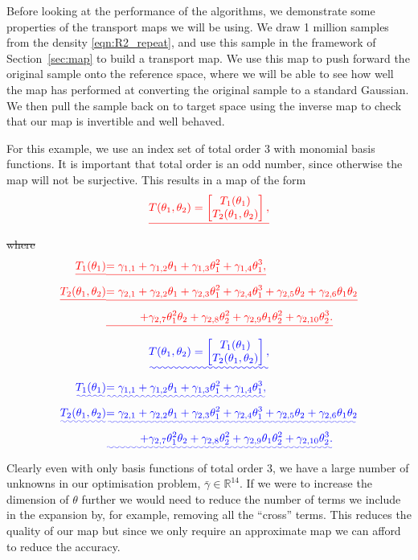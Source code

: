 \documentclass[final]{siamltex}
\providecommand{\DIFadd}[1]{{\protect\color{blue}\uwave{#1}}} %
\providecommand{\DIFdel}[1]{{\protect\color{red}\sout{#1}}}                      %
\providecommand{\DIFaddbegin}{} %
\providecommand{\DIFaddend}{} %
\providecommand{\DIFdelbegin}{} %
\providecommand{\DIFdelend}{} %
\newcommand{\DIFscaledelfig}{0.5}
\newlength{\DIFdelgraphicswidth} %
\newlength{\DIFdelgraphicsheight} %
\newcommand{\DIFaddincludegraphics}[2][]{{\color{blue}\fbox{\DIFOincludegraphics[#1]{#2}}}} %
\newcommand{\DIFdelincludegraphics}[2][]{%
\sbox{\DIFdelgraphicsbox}{\DIFOincludegraphics[#1]{#2}}%
\settoboxwidth{\DIFdelgraphicswidth}{\DIFdelgraphicsbox} %
\settoboxtotalheight{\DIFdelgraphicsheight}{\DIFdelgraphicsbox} %
\scalebox{\DIFscaledelfig}{%
\parbox[b]{\DIFdelgraphicswidth}{\usebox{\DIFdelgraphicsbox}\\[-\baselineskip] \rule{\DIFdelgraphicswidth}{0em}}\llap{\resizebox{\DIFdelgraphicswidth}{\DIFdelgraphicsheight}{%
\setlength{\unitlength}{\DIFdelgraphicswidth}%
\begin{picture}(1,1)%
\thicklines\linethickness{2pt} %
{\color[rgb]{1,0,0}\put(0,0){\framebox(1,1){}}}%
{\color[rgb]{1,0,0}\put(0,0){\line( 1,1){1}}}%
{\color[rgb]{1,0,0}\put(0,1){\line(1,-1){1}}}%
\end{picture}%
}\hspace*{3pt}}} %
} %
\DeclareRobustCommand{\DIFaddbegin}{\DIFOaddbegin \let\includegraphics\DIFaddincludegraphics} %
\DeclareRobustCommand{\DIFaddend}{\DIFOaddend \let\includegraphics\DIFOincludegraphics} %
\DeclareRobustCommand{\DIFdelbegin}{\DIFOdelbegin \let\includegraphics\DIFdelincludegraphics} %
\DeclareRobustCommand{\DIFdelend}{\DIFOaddend \let\includegraphics\DIFOincludegraphics} %
\begin{document}
Before looking at the performance of the algorithms, we demonstrate some properties of the transport maps we will be using. We draw 1 million samples from the density \eqref{eqn:R2_repeat}, and use this sample in the framework of Section~\ref{sec:map} to build a transport map. We use this map to push forward the original sample onto the reference space, where we will be able to see how well the map has performed at converting the original sample to a standard Gaussian. We then pull the sample back on to target space using the inverse map to check that our map is invertible and well behaved.

For this example, we use an index set of total order 3 with monomial
basis functions. It is important that total order is an odd number,
since otherwise the map will not be surjective. This results in a map of the form
\DIFdelbegin \[
	\DIFdel{T(\theta_1, \theta_2) = \begin{bmatrix} T_1(\theta_1) \\ T_2(\theta_1, \theta_2) \end{bmatrix},
}\]
\DIFdel{where
}\begin{align*}
		\DIFdel{T_1(\theta_1) }&\DIFdel{= \gamma_{1,1} + \gamma_{1,2}\theta_1 + \gamma_{1,3}\theta_1^2 + \gamma_{1,4}\theta_1^3, }\\
		\DIFdel{T_2(\theta_1, \theta_2) }&\DIFdel{= \gamma_{2,1} + \gamma_{2,2}\theta_1 + \gamma_{2,3}\theta_1^2 + \gamma_{2,4}\theta_1^3
					+ \gamma_{2,5}\theta_2 + \gamma_{2,6}\theta_1\theta_2 }\\
				 & \DIFdel{\qquad \quad + \gamma_{2,7}\theta_1^2\theta_2 + \gamma_{2,8}\theta_2^2 + \gamma_{2,9}\theta_1\theta_2^2 +
					 \gamma_{2,10}\theta_2^3.
}\end{align*}
\DIFdelend \DIFaddbegin \begin{equation}
	\DIFadd{T(\theta_1, \theta_2) = \begin{bmatrix} T_1(\theta_1) \\ T_2(\theta_1, \theta_2) \end{bmatrix},
}\end{equation}
\DIFadd{where
}\begin{align}
		\DIFadd{T_1(\theta_1) }&\DIFadd{= \gamma_{1,1} + \gamma_{1,2}\theta_1 + \gamma_{1,3}\theta_1^2 + \gamma_{1,4}\theta_1^3, }\\
		\DIFadd{T_2(\theta_1, \theta_2) }&\DIFadd{= \gamma_{2,1} + \gamma_{2,2}\theta_1 + \gamma_{2,3}\theta_1^2 + \gamma_{2,4}\theta_1^3
					+ \gamma_{2,5}\theta_2 + \gamma_{2,6}\theta_1\theta_2 }\\
				 & \DIFadd{\qquad \quad + \gamma_{2,7}\theta_1^2\theta_2 + \gamma_{2,8}\theta_2^2 + \gamma_{2,9}\theta_1\theta_2^2 +
					 \gamma_{2,10}\theta_2^3.
}\end{align}
\DIFaddend Clearly even with only basis functions of total order 3, we have a large number of unknowns in our optimisation problem, $\bar{\gamma} \in \mathbb{R}^{14}$. If we were to increase the dimension of $\theta$ further we would need to reduce the number of terms we include in the expansion by, for example, removing all the ``cross'' terms. This reduces the quality of our map but since we only require an approximate map we can afford to reduce the accuracy.
\end{document}
